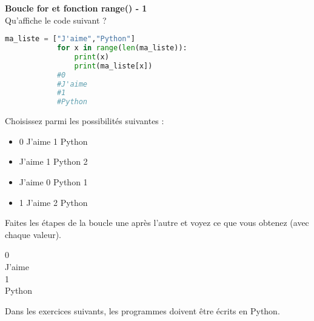 	\begin{Exercice}[5 minutes] \textbf{Boucle for et fonction range() - 1}\\
      	Qu'affiche le code suivant ?
      	
      	\begin{lstlisting}[language=Python]
         	ma_liste = ["J'aime","Python"]
      		for x in range(len(ma_liste)):
      			print(x)
           		print(ma_liste[x])
           	#0
           	#J'aime
           	#1
           	#Python
     	\end{lstlisting}
             	
        Choisissez parmi les possibilités suivantes :
        
        \begin{itemize}
        
        \item 0 
        J'aime 
        1 
        Python 
        \item J'aime  
        1 
        Python 
        2     
        \item J'aime 
        0 
        Python 
        1 
        \item 1 
        J'aime 
        2
        Python
        \end{itemize}
    
        \begin{conseil}
		   Faites les étapes de la boucle une après l'autre et voyez ce que vous obtenez (avec chaque valeur).  
        \end{conseil}
        
        \begin{solution}
            0\\
            J'aime\\
            1\\
            Python
            
        \end{solution}
    \end{Exercice} 	
	
	Dans les exercices suivants, les programmes doivent être écrits en Python.\\\\	
	
